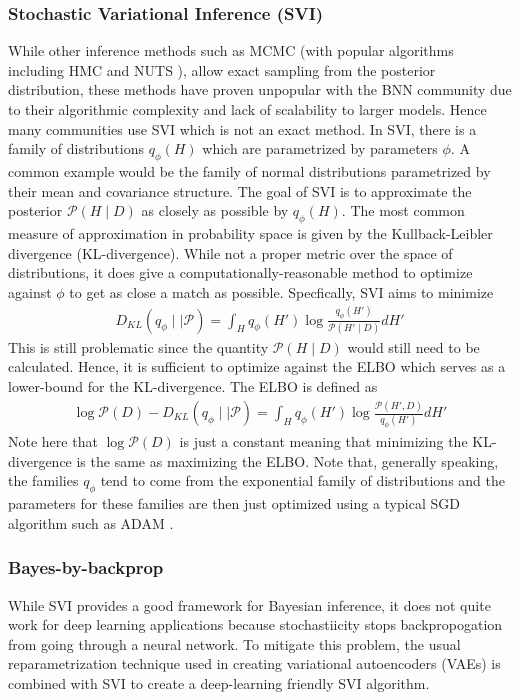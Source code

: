 \subsubsection{Stochastic Variational Inference (SVI)}
While other inference methods such as MCMC (with popular algorithms including HMC and NUTS \cite{betancourt_conceptual_2018} \cite{hoffman_no-u-turn_2011}), allow exact sampling from the posterior distribution, these methods have proven unpopular with the BNN community due to their algorithmic complexity and lack of scalability to larger models. Hence many communities use SVI which is not an exact method. In SVI, there is a family of distributions $q_{\phi}(H)$ which are parametrized by parameters $\phi$. A common example would be the family of normal distributions parametrized by their mean and covariance structure. The goal of SVI is to approximate the posterior $\mathcal{P}(H \mid D)$ as closely as possible by $q_{\phi}(H)$. The most common measure of approximation in probability space is given by the Kullback-Leibler divergence (KL-divergence). While not a proper metric over the space of distributions, it does give a computationally-reasonable method to optimize against $\phi$ to get as close a match as possible. Specfically, SVI aims to minimize
\begin{align*}
  D_{KL}(q_{\phi} \mid\mid \mathcal{P}) = \int_H q_{\phi}(H')\log \frac{q_{\phi}(H')}{\mathcal{P}(H' \mid D)} dH'
\end{align*} 
This is still problematic since the quantity $\mathcal{P}(H \mid D)$ would still need to be calculated. Hence, it is sufficient to optimize against the ELBO which serves as a lower-bound for the KL-divergence. The ELBO is defined as
\begin{align*}
  \log \mathcal{P}(D) - D_{KL}(q_{\phi} \mid\mid \mathcal{P}) = \int_H q_{\phi}(H')\log \frac{\mathcal{P}(H', D)}{q_{\phi}(H')} dH'
\end{align*}
Note here that $\log \mathcal{P}(D)$ is just a constant meaning that minimizing the KL-divergence is the same as maximizing the ELBO. Note that, generally speaking, the families $q_{\phi}$ tend to come from the exponential family of distributions and the parameters for these families are then just optimized using a typical SGD algorithm such as ADAM \cite{kingma_adam_2017}.

\subsubsection{Bayes-by-backprop}
While SVI provides a good framework for Bayesian inference, it does not quite work for deep learning applications because stochastiicity stops backpropogation from going through a neural network. To mitigate this problem, the usual reparametrization technique used in creating variational autoencoders (VAEs) \cite{kingma_introduction_2019} is combined with SVI to create a deep-learning friendly SVI algorithm.

